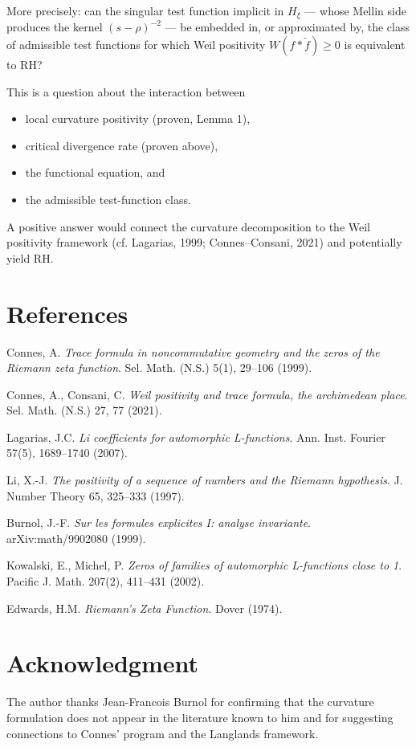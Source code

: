 \documentclass[11pt]{article}
\begin{document}
More precisely: can the singular test function implicit in $H_{\xi}$ --- whose Mellin side produces the kernel $(s-\rho)^{-2}$ --- be embedded in, or approximated by, the class of admissible test functions for which Weil positivity $W(f*\check f)\ge 0$ is equivalent to RH?

This is a question about the interaction between
\begin{itemize}[leftmargin=2em]
\item local curvature positivity (proven, Lemma 1),
\item critical divergence rate (proven above),
\item the functional equation, and
\item the admissible test-function class.
\end{itemize}
A positive answer would connect the curvature decomposition to the Weil positivity framework (cf. Lagarias, 1999; Connes--Consani, 2021) and potentially yield RH.

\section*{References}
\begin{enumerate}[label={[\arabic*]},leftmargin=2em]
\item Connes, A. \emph{Trace formula in noncommutative geometry and the zeros of the Riemann zeta function}. Sel. Math. (N.S.) 5(1), 29--106 (1999).
\item Connes, A., Consani, C. \emph{Weil positivity and trace formula, the archimedean place}. Sel. Math. (N.S.) 27, 77 (2021).
\item Lagarias, J.C. \emph{Li coefficients for automorphic L-functions}. Ann. Inst. Fourier 57(5), 1689--1740 (2007).
\item Li, X.-J. \emph{The positivity of a sequence of numbers and the Riemann hypothesis}. J. Number Theory 65, 325--333 (1997).
\item Burnol, J.-F. \emph{Sur les formules explicites I: analyse invariante}. arXiv:math/9902080 (1999).
\item Kowalski, E., Michel, P. \emph{Zeros of families of automorphic L-functions close to 1}. Pacific J. Math. 207(2), 411--431 (2002).
\item Edwards, H.M. \emph{Riemann's Zeta Function}. Dover (1974).
\end{enumerate}

\section*{Acknowledgment}
The author thanks Jean-Francois Burnol for confirming that the curvature formulation does not appear in the literature known to him and for suggesting connections to Connes' program and the Langlands framework.
\end{document}
